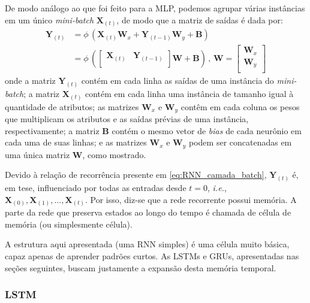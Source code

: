 \documentclass[a4paper]{article}
\begin{document}
\begin{multicols}{2}
De modo análogo ao que foi feito para a MLP, podemos agrupar várias instâncias em um único \textit{mini-batch} $\mathbf{X}_{(t)}$, de modo que a matriz de saídas é dada por: 
\begin{equation}
\begin{aligned}
\mathbf{Y}_{(t)} &= \phi\,(\mathbf{X}_{(t)}\mathbf{W}_x + \mathbf{Y}_{(t-1)}\mathbf{W}_y + \mathbf{B}) \\
&= \phi\,(\left[\begin{array}{cc}
\mathbf{X}_{(t)} & \mathbf{Y}_{(t-1)}\\
\end{array}\right]\mathbf{W}  + \mathbf{B}) \, \text{,} \, \, \mathbf{W} = \left[\begin{array}{c}
\mathbf{W}_{x} \\
\mathbf{W}_{y}\\
\end{array}\right]
\label{eq:RNN_camada_batch}
\end{aligned}
\end{equation}
onde a matriz $\mathbf{Y}_{(t)}$ contém em cada linha as saídas de uma instância do \textit{mini-batch}; a matriz $\mathbf{X}_{(t)}$ contém em cada linha uma instância de tamanho igual à quantidade de atributos; as matrizes $\mathbf{W}_{x}$ e $\mathbf{W}_{y}$ contêm em cada coluna os pesos que multiplicam os atributos e as saídas prévias de uma instância, respectivamente; a matriz $\mathbf{B}$ contém o mesmo vetor de \textit{bias} de cada neurônio em cada uma de suas linhas; e as matrizes $\mathbf{W}_{x}$ e $\mathbf{W}_{y}$ podem ser concatenadas em uma única matriz $\mathbf{W}$, como mostrado.

Devido à relação de recorrência presente em \eqref{eq:RNN_camada_batch}, $\mathbf{Y}_{(t)}$ é, em tese, influenciado por todas as entradas desde $t = 0$, \textit{i.e.}, $\mathbf{X}_{(0)}, \mathbf{X}_{(1)},\ldots, \mathbf{X}_{(t)}$. Por isso, diz-se que a rede recorrente possui memória. A parte da rede que preserva estados ao longo do tempo é chamada de célula de memória (ou simplesmente célula).

A estrutura aqui apresentada (uma RNN simples) é uma célula muito básica, capaz apenas de aprender padrões curtos. As LSTMs e GRUs, apresentadas nas seções seguintes, buscam justamente a expansão desta memória temporal.

\subsubsection{LSTM}
\label{subsubsec:lstm_descricao}


\end{multicols}
\end{document}
